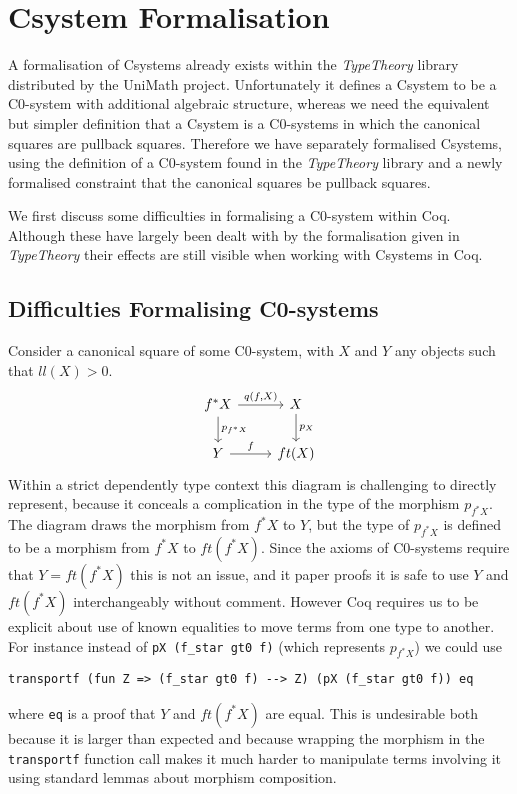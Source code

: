 \chapter{Csystem Formalisation}
A formalisation of Csystems already exists within the \textit{TypeTheory}
library distributed by the UniMath project. Unfortunately it defines a Csystem
to be a C0-system with additional algebraic structure, whereas we need the
equivalent but simpler definition that a Csystem is a C0-systems in which the
canonical squares are pullback squares. Therefore we have separately formalised
Csystems, using the definition of a C0-system found in the \textit{TypeTheory}
library and a newly formalised constraint that the canonical squares be pullback
squares.

We first discuss some difficulties in formalising a C0-system within Coq.
Although these have largely been dealt with by the formalisation given in
\textit{TypeTheory} their effects are still visible when working with Csystems
in Coq.

\section{Difficulties Formalising C0-systems}
Consider a canonical square of some C0-system, with $X$ and $Y$ any objects such
that $ll(X) > 0$.
\[
\begin{tikzcd}
    f^*X\ar[r,"{q(f,X)}"]\ar[d,"p_{f^*X}"]&X\ar[d,"p_X"] \\
    Y\ar[r,"f"]&ft(X)
\end{tikzcd}
\]
Within a strict dependently type context this diagram is challenging to directly
represent, because it conceals a complication in the type of the morphism
$p_{f^*X}$. The diagram draws the morphism from $f^*X$ to $Y$, but the type of
$p_{f^*X}$ is defined to be a morphism from $f^*X$ to $ft(f^*X)$. Since the
axioms of C0-systems require that $Y=ft(f^*X)$ this is not an issue, and it
paper proofs it is safe to use $Y$ and $ft(f^*X)$ interchangeably without
comment. However Coq requires us to be explicit about use of known equalities to
move terms from one type to another. For instance instead of 
\verb|pX (f_star gt0 f)| (which represents $p_{f^*X}$) we could use
\begin{lstlisting}
transportf (fun Z => (f_star gt0 f) --> Z) (pX (f_star gt0 f)) eq
\end{lstlisting}
where \verb|eq| is a proof that $Y$ and $ft(f^*X)$ are equal. This is
undesirable both because it is larger than expected and because wrapping the
morphism in the \verb|transportf| function call makes it much harder to
manipulate terms involving it using standard lemmas about morphism composition.

